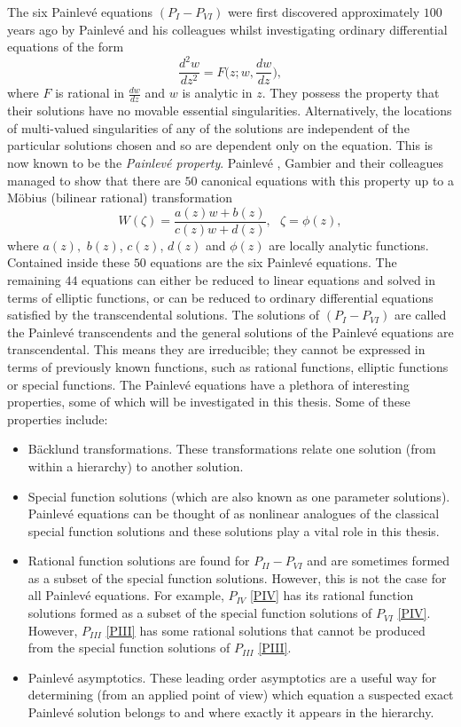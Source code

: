 \documentclass[12pt]{article}
\def\B{\rm{B\"ack\-lund }}
\def\P{Painlev\'e }
\numberwithin{figure}{section}
\numberwithin{equation}{section}
\numberwithin{table}{section}
\begin{document}
The six \P equations $(P_I - P_{VI})$ were first discovered approximately $100$ years ago by \P and his colleagues whilst investigating ordinary differential equations of the form
\begin{equation}\nonumber
\frac{d^2w}{dz^2}=F\bigg(z;w,\frac{dw}{dz}\bigg),
\end{equation}
where $F$ is rational in $\frac{dw}{dz}$ and $w$ is analytic in $z$. They possess the property that their solutions have no movable essential singularities. Alternatively, the locations of multi-valued singularities of any of the solutions are independent of the particular solutions chosen and so are dependent only on the equation.
This is now known to be the {\it\P property}. \P\hspace{-1mm}, Gambier and their colleagues managed to
show that there are $50$ canonical equations with this property up to a M\"obius (bilinear rational) transformation
$$
W(\zeta)=\frac{a(z)w+b(z)}{c(z)w+d(z)},~~~\zeta=\phi(z),
$$
where $a(z),$ $b(z)$, $c(z)$, $d(z)$ and $\phi(z)$ are locally analytic functions.
Contained inside these $50$ equations are the six \P equations. The remaining $44$ equations can either be reduced to linear equations and
solved in terms of elliptic functions, or can be reduced to ordinary differential equations satisfied by the transcendental solutions.  The solutions of $(P_I - P_{VI})$ are called the \P transcendents and the general solutions of the \P equations are transcendental. This means they are irreducible; they cannot be expressed in terms of previously known functions, such as rational functions, elliptic functions or special functions. The \P equations have a plethora of interesting properties, some of which will be investigated in this thesis. Some of these properties include:
\begin{itemize}
\item \B transformations. These transformations relate one solution (from within a hierarchy) to another solution.
\item Special function solutions (which are also known as one parameter solutions). \P equations can be thought of as nonlinear analogues of the classical special function solutions and these solutions play a vital role in this thesis.
\item Rational function solutions are found for $P_{II} - P_{VI}$ and are sometimes formed as a subset of the special function solutions. However, this is not the case for all \P equations. For example, $P_{IV}$ \eqref{PIV} has its rational function solutions formed as a subset of the special function solutions of $P_{VI}$ \eqref{PIV}. However, $P_{III}$ \eqref{PIII} has some rational solutions that cannot be produced from the special function solutions of $P_{III}$ \eqref{PIII}.
\item \P asymptotics. These leading order asymptotics are a useful way for determining (from an applied point of view) which equation a suspected exact \P solution belongs to and where exactly it appears in the hierarchy.
\end{itemize}
\end{document}

